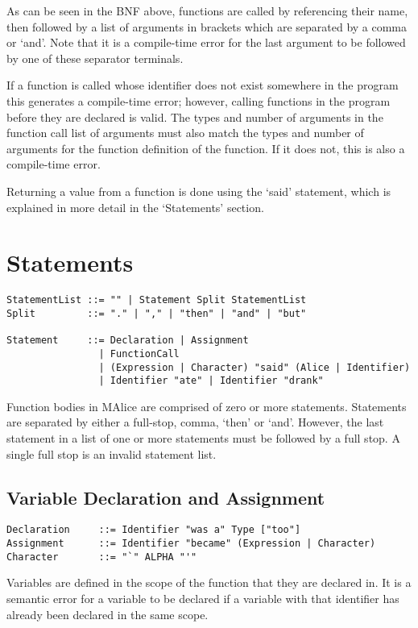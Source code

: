 \documentclass[a4wide, 11pt]{article}
\begin{document}
As can be seen in the BNF above, functions are called by referencing their name, then followed by a list of arguments in brackets which are separated by a comma or `and'. Note that it is a compile-time error for the last argument to be followed by one of these separator terminals.

If a function is called whose identifier does not exist somewhere in the program this generates a compile-time error; however, calling functions in the program before they are declared is valid. The types and number of arguments in the function call list of arguments must also match the types and number of arguments for the function definition of the function. If it does not, this is also a compile-time error.

Returning a value from a function is done using the `said' statement, which is explained in more detail in the `Statements' section.

\section{Statements}

\begin{verbatim}
StatementList ::= "" | Statement Split StatementList
Split         ::= "." | "," | "then" | "and" | "but"

Statement     ::= Declaration | Assignment
                | FunctionCall
                | (Expression | Character) "said" (Alice | Identifier)
                | Identifier "ate" | Identifier "drank"
\end{verbatim}

Function bodies in MAlice are comprised of zero or more statements. Statements are separated by either a full-stop, comma, `then' or `and'. However, the last statement in a list of one or more statements must be followed by a full stop. A single full stop is an invalid statement list.

\subsection{Variable Declaration and Assignment}

\begin{verbatim}
Declaration     ::= Identifier "was a" Type ["too"]
Assignment      ::= Identifier "became" (Expression | Character)
Character       ::= "`" ALPHA "'"
\end{verbatim}

Variables are defined in the scope of the function that they are declared in. It is a semantic error for a variable to be declared if a variable with that identifier has already been declared in the same scope.
\end{document}
